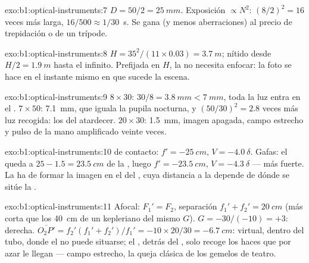 \begin{solution}{exo:b1:optical-instruments:7}
$D = 50/2 = \qty{25}{mm}$. Exposición $\propto N^2$: $(8/2)^2 = 16$ veces
más larga, $16/500 \approx 1/30$~\unit{s}. Se gana  (y
menos aberraciones) al precio de trepidación o de un trípode.
\end{solution}

\begin{solution}{exo:b1:optical-instruments:8}
$H = 35^2/(11 \times 0.03) = \qty{3.7}{m}$; nítido desde $H/2 =
\qty{1.9}{m}$ hasta el infinito. Prefijada en $H$, la  no necesita
enfocar: la foto se hace en el instante mismo en que sucede la escena.
\end{solution}

\begin{solution}{exo:b1:optical-instruments:9}
$8\times30$:  $30/8 = \qty{3.8}{mm} < \qty{7}{mm}$, toda
la luz entra en el . $7\times50$: \qty{7.1}{mm}, que iguala la pupila
nocturna, y $(50/30)^2 = 2.8$ veces más luz recogida: los del atardecer.
$20\times30$:  \qty{1.5}{mm}, imagen apagada, campo
estrecho y pulso de la mano amplificado veinte veces.
\end{solution}

\begin{solution}{exo:b1:optical-instruments:10}
 de contacto: $f' = \qty{-25}{cm}$, $V = \qty{-4.0}{\delta}$. Gafas:
el  queda a $25 - 1.5 = \qty{23.5}{cm}$ de la , luego $f' =
\qty{-23.5}{cm}$, $V = \qty{-4.3}{\delta}$ --- más fuerte. La  ha de
formar la imagen en el  del , cuya distancia a la 
depende de dónde se sitúe la .
\end{solution}

\begin{solution}{exo:b1:optical-instruments:11}
Afocal: $F_1' = F_2$, separación $f_1' + f_2' = \qty{20}{cm}$ (más corta
que los \qty{40}{cm} de un kepleriano del mismo $G$). $G = -30/(-10) =
+3$: derecha.  $\overline{O_2P'} = f_2'(f_1' + f_2')/f_1' =
-10 \times 20/30 = \qty{-6.7}{cm}$: virtual, dentro del tubo, donde el 
no puede situarse; el , detrás del , solo recoge los haces que
por azar le llegan --- campo estrecho, la queja clásica de los gemelos de
teatro.
\end{solution}


